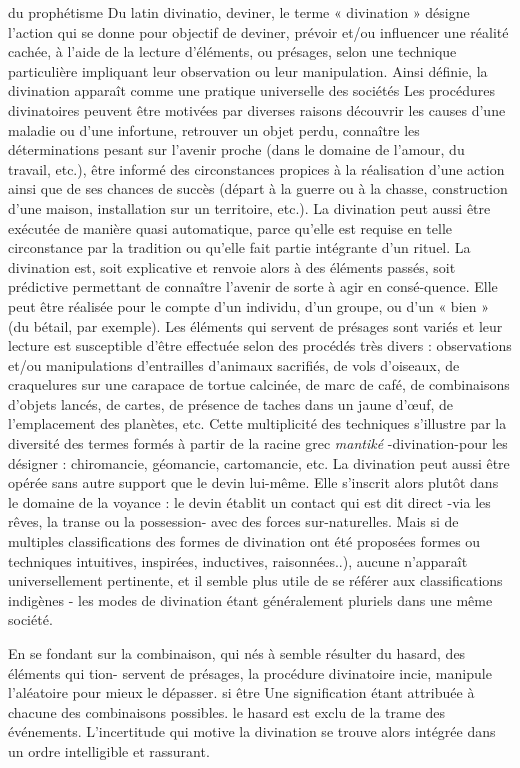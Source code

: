  
 du prophétisme
Du latin divinatio, deviner, le terme « divination » désigne l'action qui se donne pour objectif de deviner, prévoir et/ou influencer
une réalité cachée, à l'aide de la lecture d'éléments, ou présages, selon une technique particulière impliquant leur observation ou leur manipulation. Ainsi définie, la divination apparaît comme une pratique universelle des sociétés  Les procédures divinatoires peuvent être motivées par diverses raisons découvrir les causes d'une maladie ou d'une infortune, retrouver un objet perdu, connaître les déterminations pesant sur l'avenir proche (dans le domaine de l'amour, du travail, etc.), être informé des circonstances propices à la réalisation d'une action ainsi que de ses chances de succès (départ à la guerre ou à la chasse, construction d'une maison, installation sur un territoire, etc.). La divination peut aussi être exécutée de manière quasi automatique, parce qu'elle est requise en telle circonstance par la tradition ou qu'elle fait partie intégrante d'un rituel. La divination est, soit explicative   et renvoie alors à des éléments passés, soit prédictive permettant de
connaître l'avenir de sorte à agir en consé-quence. Elle peut être réalisée pour le compte d'un individu, d'un groupe, ou d'un « bien » (du bétail, par exemple).
Les éléments qui servent de présages sont variés et leur lecture est susceptible d'être effectuée selon des procédés très divers : observations et/ou manipulations d'entrailles d'animaux sacrifiés, de vols d'oiseaux, de craquelures sur une carapace de tortue calcinée, de marc de café, de combinaisons d'objets lancés, de cartes, de présence de taches dans un jaune d'œuf, de l'emplacement des planètes, etc. Cette multiplicité des techniques s'illustre par la diversité des termes formés à partir de la racine grec \textit{mantiké} -divination-pour les désigner : chiromancie, géomancie, cartomancie, etc. La divination peut aussi être opérée sans autre support que le devin lui-même. Elle s'inscrit alors plutôt dans le domaine de la voyance : le devin établit un contact qui est dit direct -via les rêves, la transe ou la possession- avec des forces sur-naturelles. Mais si de multiples classifications des formes de divination ont été proposées formes ou techniques intuitives, inspirées, inductives, raisonnées..), aucune n'apparaît universellement pertinente, et il semble plus utile de se référer aux classifications indigènes
- les modes de divination étant généralement pluriels dans une même société.

En se fondant sur la combinaison, qui
nés à semble résulter du hasard, des éléments qui tion- servent de présages, la procédure divinatoire incie, manipule l'aléatoire pour mieux le dépasser.
si être
Une signification étant attribuée à chacune
 des combinaisons possibles. le hasard est   exclu de la trame des événements. L'incertitude qui motive la divination se trouve alors   intégrée dans un ordre intelligible et
  rassurant.
 

